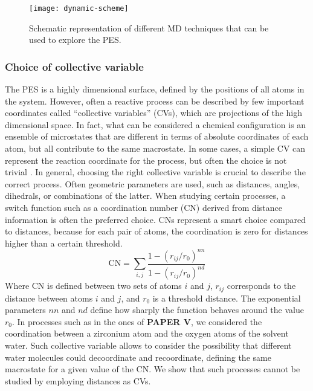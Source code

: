 \begin{figure}[!htbp]
	\centering
 	\texttt{[image: dynamic-scheme]}
	\caption{Schematic representation of different MD techniques that can be used to explore the PES.}
	\label{fig:dynamic-scheme}
\end{figure}


\subsubsection*{Choice of collective variable}
The PES is a highly dimensional surface, defined by the positions of all atoms in the system. However, often a reactive process can be described by few important coordinates called ``collective variables'' (CVs), which are projections of the high dimensional space. In fact, what can be considered a chemical configuration is an ensemble of microstates that are different in terms of absolute coordinates of each atom, but all contribute to the same macrostate. In some cases, a simple CV can represent the reaction coordinate for the process, but often the choice is not trivial \cite{rohrdanz2013discovering}. In general, choosing the right collective variable is crucial to describe the correct process. Often geometric parameters are used, such as distances, angles, dihedrals, or combinations of the latter. When studying certain processes, a switch function such as a coordination number (CN) derived from distance information is often the preferred choice. CNs represent a smart choice compared to distances, because for each pair of atoms, the coordination is zero for distances higher than a certain threshold.
\[
\mathrm{CN} =\sum_{i,j}\frac{1-(r_{ij}/r_0 )^{nn}}{1-(r_{ij}/r_0 )^{nd}}
\] 
Where CN is defined between two sets of atoms ${i}$ and ${j}$, $r_{ij}$ corresponds to the distance between atoms $i$ and $j$, and $r_0$ is a threshold distance. The exponential parameters $nn$ and $nd$ define how sharply the function behaves around the value $r_0$. In processes such as in the ones of \textbf{PAPER V}, we considered the coordination between a zirconium atom and the oxygen atoms of the solvent water. Such collective variable allows to consider the possibility that different water molecules could decoordinate and recoordinate, defining the same macrostate for a given value of the CN. We show that such processes cannot be studied by employing distances as CVs.

